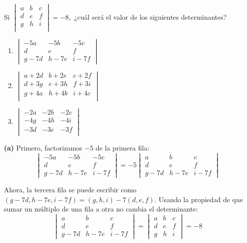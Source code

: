 \begin{prob}
Si $\begin{vmatrix}
a&b&c\\d&e&f\\g&h&i\\
\end{vmatrix}=-8,$ ¿cuál será el valor de los siguientes determinantes? 

\begin{multicols}{3}
\begin{enumerate}[$(a)$]
\item $\begin{vmatrix}
-5a&-5b&-5c\\d&e&f\\g-7d&h-7e&i-7f
\end{vmatrix}$

\item $\begin{vmatrix}
a+2d&b+2e&c+2f\\d+3g&e+3h&f+3i\\g+4a&h+4b&i+4c\\
\end{vmatrix}$

\item $\begin{vmatrix}
-2a&-2b&-2c\\-4g&-4h&-4i\\-3d&-3e&-3f\\
\end{vmatrix}$
\end{enumerate}
\end{multicols}

\begin{myproof}
\textbf{(a)} Primero, factorizamos $-5$ de la primera fila:
$$\begin{vmatrix}
-5a&-5b&-5c\\d&e&f\\g-7d&h-7e&i-7f
\end{vmatrix} = -5\begin{vmatrix}
a&b&c\\d&e&f\\g-7d&h-7e&i-7f
\end{vmatrix}$$

Ahora, la tercera fila se puede escribir como $(g-7d, h-7e, i-7f) = (g,h,i) - 7(d,e,f)$. Usando la propiedad de que sumar un múltiplo de una fila a otra no cambia el determinante:
$$\begin{vmatrix}
a&b&c\\d&e&f\\g-7d&h-7e&i-7f
\end{vmatrix} = \begin{vmatrix}
a&b&c\\d&e&f\\g&h&i
\end{vmatrix} = -8$$


\end{myproof}
\end{prob}

